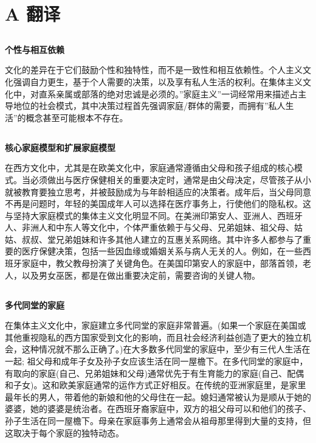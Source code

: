 \documentclass[12pt]{article}
\begin{document}
	\section{A 翻译}
	\begin{spacing}{1.25}
		{\large 
			\subsection{}
			
			\subsection{}
			\textbf{个性与相互依赖}
			
			文化的差异在于它们鼓励个性和独特性，而不是一致性和相互依赖性。个人主义文化强调自力更生，基于个人需要的决策，以及享有私人生活的权利。在集体主义文化中，对直系亲属或部落的绝对忠诚是必须的。”家庭主义”一词经常用来描述占主导地位的社会模式，其中决策过程首先强调家庭/群体的需要，而拥有”私人生活”的概念甚至可能根本不存在。
			\subsection{}
			\textbf{核心家庭模型和扩展家庭模型}
			
			在西方文化中，尤其是在欧美文化中，家庭通常遵循由父母和孩子组成的核心模式。当必须做出与医疗保健相关的重要决定时，通常是由父母决定，尽管孩子从小就被教育要独立思考，并被鼓励成为与年龄相适应的决策者。成年后，当父母同意不再是问题时，年轻的美国成年人可以选择在医疗事务上，行使他们的隐私权。这与坚持大家庭模式的集体主义文化明显不同。在美洲印第安人、亚洲人、西班牙人、非洲人和中东人等文化中，个体严重依赖于与父母、兄弟姐妹、祖父母、姑姑、叔叔、堂兄弟姐妹和许多其他人建立的互惠关系网络。其中许多人都参与了重要的医疗保健决策，包括一些因血缘或婚姻关系与病人无关的人。例如，在一些西班牙家庭中，教父教母扮演了关键角色。在美国印第安人的家庭中，部落首领，老人，以及男女巫医，都是在做出重要决定前，需要咨询的关键人物。
			\subsection{}
			\textbf{多代同堂的家庭}
			
			在集体主义文化中，家庭建立多代同堂的家庭非常普遍。(如果一个家庭在美国或其他重视隐私的西方国家受到文化的影响，而且社会经济利益创造了更大的独立机会，这种情况就不那么正确了。)在大多数多代同堂的家庭中，至少有三代人生活在一起; 祖父母和成年子女及孙子女应该生活在同一屋檐下。在多代同堂的家庭中，有取向的家庭(自己、兄弟姐妹和父母)通常优先于有生育能力的家庭(自己、配偶和子女)。这和欧美家庭通常的运作方式正好相反。在传统的亚洲家庭里，是家里最年长的男人，带着他的新娘和他的父母住在一起。媳妇通常被认为是顺从于她的婆婆，她的婆婆是统治者。在西班牙裔家庭中，双方的祖父母可以和他们的孩子、孙子生活在同一屋檐下。母亲在家庭事务上通常会从祖母那里得到大量的支持，但这取决于每个家庭的独特动态。
}
\end{spacing}
\end{document}
